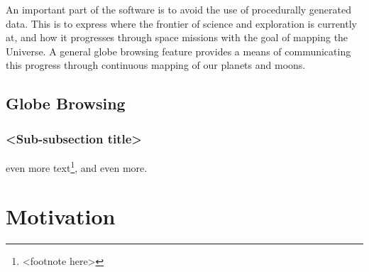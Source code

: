 An important part of the software is to avoid the use of procedurally generated data. This is to express where the frontier of science and exploration is currently at, and how it progresses through space missions with the goal of mapping the Universe. A general globe browsing feature provides a means of communicating this progress through continuous mapping of our planets and moons.

\subsection{Globe Browsing}

\subsubsection{<Sub-subsection title>}
even more text\footnote{<footnote here>}, and even more.

\section{Motivation}
